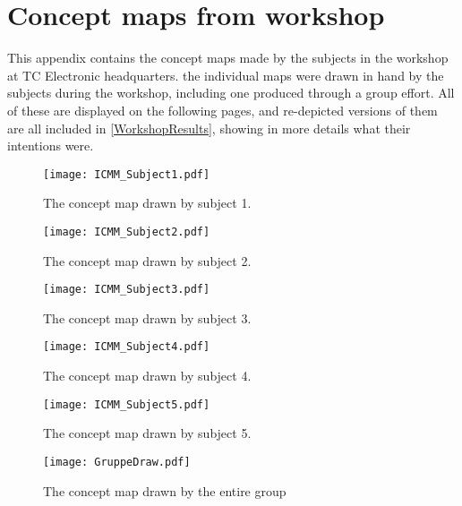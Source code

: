 \chapter{Concept maps from workshop}
\label{App:WorkshopConceptMaps}
This appendix contains the concept maps made by the subjects in the workshop at TC Electronic headquarters. the individual maps were drawn in hand by the subjects during the workshop, including one produced through a group effort. All of these are displayed on the following pages, and re-depicted versions of them are all included in \autoref{WorkshopResults}, showing in more details what their intentions were.
%
\newpage
%
\begin{figure}[H]
	\centering
	\texttt{[image: ICMM\_Subject1.pdf]}
	\caption{The concept map drawn by subject 1.}
	\label{fig:DrawnICMM1}
\end{figure}
%
\begin{figure}[H]
	\centering
	\texttt{[image: ICMM\_Subject2.pdf]}
	\caption{The concept map drawn by subject 2.}
	\label{fig:DrawnICMM2}
\end{figure}
%
\begin{figure}[H]
	\centering
	\texttt{[image: ICMM\_Subject3.pdf]}
	\caption{The concept map drawn by subject 3.}
	\label{fig:DrawnICMM3}
\end{figure}
%
\begin{figure}[H]
	\centering
	\texttt{[image: ICMM\_Subject4.pdf]}
	\caption{The concept map drawn by subject 4.}
	\label{fig:DrawnICMM4}
\end{figure}
%
\begin{figure}[H]
	\centering
	\texttt{[image: ICMM\_Subject5.pdf]}
	\caption{The concept map drawn by subject 5.}
	\label{fig:DrawnICMM5}
\end{figure}
%
\begin{figure}[H]
	\centering
	\texttt{[image: GruppeDraw.pdf]}
	\caption{The concept map drawn by the entire group}
	\label{fig:GroupDraw}
\end{figure}

